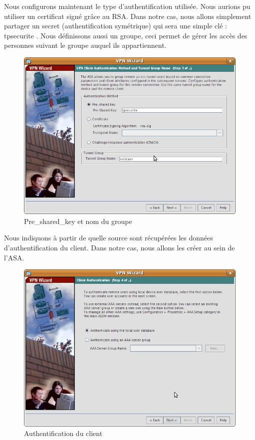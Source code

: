 \documentclass[a4paper,12pt]{article}
\begin{document}
Nous configurons maintenant le type d'authentification utilisée. Nous aurions pu utiliser un certificat signé grâce au RSA. Dans notre cas, nous allons
simplement partager un secret (authentification symétrique) qui sera une simple clé : \og tpsecurite \fg. Nous définissons aussi un groupe, ceci permet
de gérer les accès des personnes suivant le groupe auquel ils appartiennent.
\begin{figure}[H]
	\center
	\includegraphics[width=12cm]{img/vpn3.png}
	\caption{Pre\_shared\_key et nom du groupe}
\end{figure}

Nous indiquons à partir de quelle source sont récupérées les données d'authentification du client. Dans notre cas, nous allons les créer au sein de l'ASA.
\begin{figure}[H]
	\center
	\includegraphics[width=12cm]{img/vpn4.png}
	\caption{Authentification du client}
\end{figure}
\end{document}
